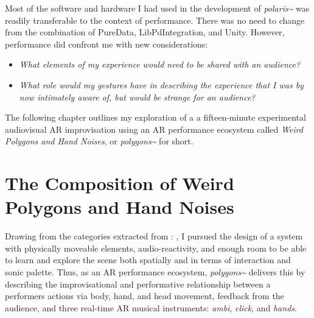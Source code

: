 Most of the software and hardware I had used in the development of \textit{polaris\textasciitilde{}} was readily transferable to the context of performance. There was no need to change from the combination of PureData, LibPdIntegration, and Unity. However, performance did confront me with new considerations: 
\begin{itemize}
    \item \textit{What elements of my experience would need to be shared with an audience?} 
    \item \textit{What role would my gestures have in describing the experience that I was by now intimately aware of, but would be strange for an audience?} 
\end{itemize}
The following chapter outlines my exploration of a a fifteen-minute experimental audiovisual AR improvisation using an AR performance ecosystem called \textit{Weird Polygons and Hand Noises}, or \textit{polygons\textasciitilde{}} for short.



\section{The Composition of Weird Polygons and Hand Noises} \label{sec: polygons-composition}

Drawing from the categories extracted from : , I pursued the design of a system with physically moveable elements, audio-reactivity, and enough room to be able to learn and explore the scene both spatially and in terms of interaction and sonic palette. Thus, as an AR performance ecosystem, \textit{polygons\textasciitilde{}} delivers this by describing the improvisational and performative relationship between a performers actions via body, hand, and head movement, feedback from the audience, and three real-time AR musical instruments: \textit{ambi}, \textit{click}, and \textit{hands}. 

